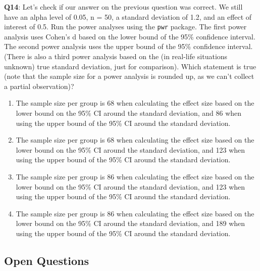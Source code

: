\documentclass[
  oneside]{book}
\providecommand{\tightlist}{%
  \setlength{\itemsep}{0pt}\setlength{\parskip}{0pt}}
\begin{document}
\textbf{Q14}: Let's check if our answer on the previous question was correct. We still have an alpha level of 0.05, n = 50, a standard deviation of 1.2, and an effect of interest of 0.5. Run the power analyses using the \texttt{pwr} package. The first power analysis uses Cohen's d based on the lower bound of the 95\% confidence interval. The second power analysis uses the upper bound of the 95\% confidence interval. (There is also a third power analysis based on the (in real-life situations unknown) true standard deviation, just for comparison). Which statement is true (note that the sample size for a power analysis is rounded up, as we can't collect a partial observation)?

\begin{enumerate}
\def\labelenumi{\Alph{enumi})}
\tightlist
\item
  The sample size per group is 68 when calculating the effect size based on the lower bound on the 95\% CI around the standard deviation, and 86 when using the upper bound of the 95\% CI around the standard deviation.
\item
  The sample size per group is 68 when calculating the effect size based on the lower bound on the 95\% CI around the standard deviation, and 123 when using the upper bound of the 95\% CI around the standard deviation.
\item
  The sample size per group is 86 when calculating the effect size based on the lower bound on the 95\% CI around the standard deviation, and 123 when using the upper bound of the 95\% CI around the standard deviation.
\item
  The sample size per group is 86 when calculating the effect size based on the lower bound on the 95\% CI around the standard deviation, and 189 when using the upper bound of the 95\% CI around the standard deviation.
\end{enumerate}

\hypertarget{open-questions-5}{%
\subsection{Open Questions}\label{open-questions-5}}
\end{document}
